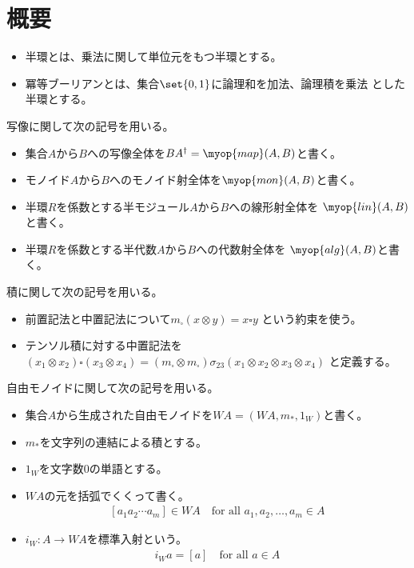 \section{概要}\label{s1:概要} %
	\begin{itemize}\setlength{\itemsep}{-1mm} %
		\item 半環とは、乗法に関して単位元をもつ半環とする。
		\item 冪等ブーリアンとは、集合$\set{0,1}$に論理和を加法、論理積を乗法
		とした半環とする。
	\end{itemize} %
	写像に関して次の記号を用いる。
	\begin{itemize}\setlength{\itemsep}{-1mm} %
		\item 集合$A$から$B$への写像全体を$BA^\dag=\myop{map}(A,B)$と書く。
		\item モノイド$A$から$B$へのモノイド射全体を$\myop{mon}(A,B)$と書く。
		\item 半環$R$を係数とする半モジュール$A$から$B$への線形射全体を
		$\myop{lin}(A,B)$と書く。
		\item 半環$R$を係数とする半代数$A$から$B$への代数射全体を
		$\myop{alg}(A,B)$と書く。
	\end{itemize} %
	積に関して次の記号を用いる。
	\begin{itemize}\setlength{\itemsep}{-1mm} %
		\item 前置記法と中置記法について$m_\square(x\otimes y)=x\square y$
		という約束を使う。
		\item テンソル積に対する中置記法を
		$(x_1\otimes x_2)\square(x_3\otimes x_4)
		=(m_\square\otimes m_\square)\sigma_{23}
		(x_1\otimes x_2\otimes x_3\otimes x_4)$
		と定義する。
	\end{itemize} %
	自由モノイドに関して次の記号を用いる。
	\begin{itemize}\setlength{\itemsep}{-1mm} %
		\item 集合$A$から生成された自由モノイドを$WA=(WA,m_*,1_W)$と書く。
		\item $m_*$を文字列の連結による積とする。
		\item $1_W$を文字数$0$の単語とする。
		\item $WA$の元を括弧でくくって書く。
		\begin{equation*}\begin{split} %
			[a_1a_2\cdots a_m]\in WA \quad\text{for all }a_1,a_2,\dots,a_m\in A
		\end{split}\end{equation*} %
		\item $i_W:A\to WA$を標準入射という。
		\begin{equation*}\begin{split} %
			i_Wa=[a] \quad\text{for all }a\in A
		\end{split}\end{equation*} %
	\end{itemize} %
